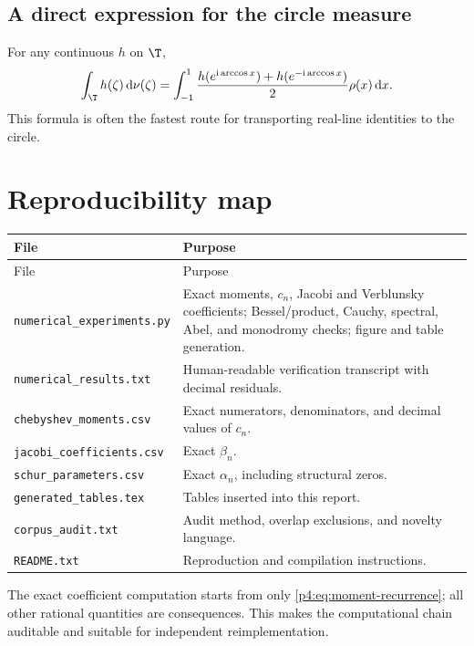\documentclass[11pt,oneside]{article}
\theoremstyle{definition}
\newcommand{\dd}{\,\mathrm d}
\newcommand{\ii}{\mathrm i}
\begin{document}
\subsection{A direct expression for the circle measure}

For any continuous \(h\) on \(\T\),
\begin{equation}
 \int_{\T}h(\zeta)\dd\nu(\zeta)
 =\int_{-1}^{1}\frac{h(e^{\ii\arccos x})+h(e^{-\ii\arccos x})}{2}
 \rho(x)\dd x.
 \label{p4:eq:nu-pushforward}
\end{equation}
This formula is often the fastest route for transporting real-line identities to the circle.

\section{Reproducibility map}
\label{p4:app:code}

\begin{longtable}{p{}p{}}
\toprule
File & Purpose\\
\midrule
\endfirsthead
\toprule
File & Purpose\\
\midrule
\endhead
\bottomrule
\endfoot
\texttt{numerical\_experiments.py} & Exact moments, \(c_n\), Jacobi and Verblunsky
coefficients; Bessel/product, Cauchy, spectral, Abel, and monodromy checks; figure and table
generation.\\
\texttt{numerical\_results.txt} & Human-readable verification transcript with decimal
residuals.\\
\texttt{chebyshev\_moments.csv} & Exact numerators, denominators, and decimal values of
\(c_n\).\\
\texttt{jacobi\_coefficients.csv} & Exact \(\beta_n\).\\
\texttt{schur\_parameters.csv} & Exact \(\alpha_n\), including structural zeros.\\
\texttt{generated\_tables.tex} & Tables inserted into this report.\\
\texttt{corpus\_audit.txt} & Audit method, overlap exclusions, and novelty language.\\
\texttt{README.txt} & Reproduction and compilation instructions.\\
\end{longtable}

The exact coefficient computation starts from only \eqref{p4:eq:moment-recurrence}; all other
rational quantities are consequences. This makes the computational chain auditable and
suitable for independent reimplementation.
\end{document}

